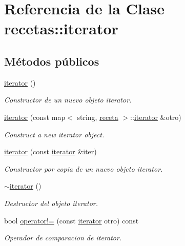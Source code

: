 \hypertarget{classrecetas_1_1iterator}{}\section{Referencia de la Clase recetas\+:\+:iterator}
\label{classrecetas_1_1iterator}
\subsection*{Métodos públicos}
\begin{DoxyCompactItemize}
\item 
\hyperlink{classrecetas_1_1iterator_aedaa764b6ad6434a0345b2a3800ccddc}{iterator} ()
\begin{DoxyCompactList}\small\item\em Constructor de un nuevo objeto iterator. \end{DoxyCompactList}\item 
\hyperlink{classrecetas_1_1iterator_a88a67e3c3928c409f5e1ddf129a7f547}{iterator} (const map$<$ string, \hyperlink{classreceta}{receta} $>$\+::\hyperlink{classrecetas_1_1iterator}{iterator} \&otro)
\begin{DoxyCompactList}\small\item\em Construct a new iterator object. \end{DoxyCompactList}\item 
\hyperlink{classrecetas_1_1iterator_a3598837a87526535f1d7b4f06e29edc3}{iterator} (const \hyperlink{classrecetas_1_1iterator}{iterator} \&iter)
\begin{DoxyCompactList}\small\item\em Constructor por copia de un nuevo objeto iterator. \end{DoxyCompactList}\item 
\hyperlink{classrecetas_1_1iterator_a9789932f8c00bdb41360599cc442a920}{$\sim$iterator} ()
\begin{DoxyCompactList}\small\item\em Destructor del objeto iterator. \end{DoxyCompactList}\item 
bool \hyperlink{classrecetas_1_1iterator_aaf5c81706c5c44f0d6b4e9e274192c95}{operator!=} (const \hyperlink{classrecetas_1_1iterator}{iterator} otro) const
\begin{DoxyCompactList}\small\item\em Operador de comparacion de iterator. \end{DoxyCompactList}\item 

\end{DoxyCompactItemize}
